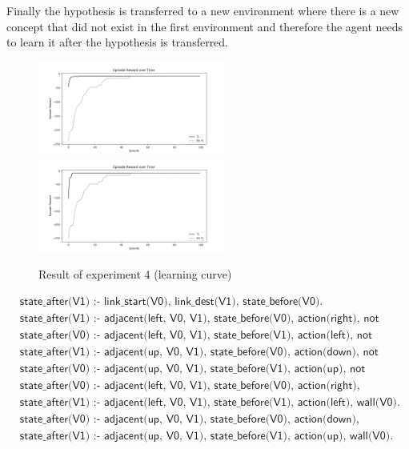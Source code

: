 Finally the hypothesis is transferred to a new environment where there is a new concept that did not exist in the first environment
and therefore the agent needs to learn it after the hypothesis is transferred.

\begin{figure}[!htb]
\centerline{
\includegraphics[width=0.55\textwidth]{./figures/experiment4_training}
\includegraphics[width=0.55\textwidth]{./figures/experiment4_test}
}
\caption{Result of experiment 4 (learning curve)}
\label{experiment5_training}
\end{figure}


\begin{equation}
\begin{split}
&\textsf{state\_after(V1) :- link\_start(V0), link\_dest(V1), state\_before(V0).}\\
&\textsf{state\_after(V1) :- adjacent(left, V0, V1), state\_before(V0), action(right), not wall(V1).}\\
&\textsf{state\_after(V0) :- adjacent(left, V0, V1), state\_before(V1), action(left), not wall(V0).}\\
&\textsf{state\_after(V1) :- adjacent(up, V0, V1), state\_before(V0), action(down), not wall(V1).}\\
&\textsf{state\_after(V0) :- adjacent(up, V0, V1), state\_before(V1), action(up), not wall(V0).}\\
&\textsf{state\_after(V0) :- adjacent(left, V0, V1), state\_before(V0), action(right), wall(V1).}\\
&\textsf{state\_after(V1) :- adjacent(left, V0, V1), state\_before(V1), action(left), wall(V0).}\\
&\textsf{state\_after(V0) :- adjacent(up, V0, V1), state\_before(V0), action(down), wall(V1).}\\
&\textsf{state\_after(V1) :- adjacent(up, V0, V1), state\_before(V1), action(up), wall(V0).}
\end{split}
\label{experiment4_ilasp}
\end{equation}

